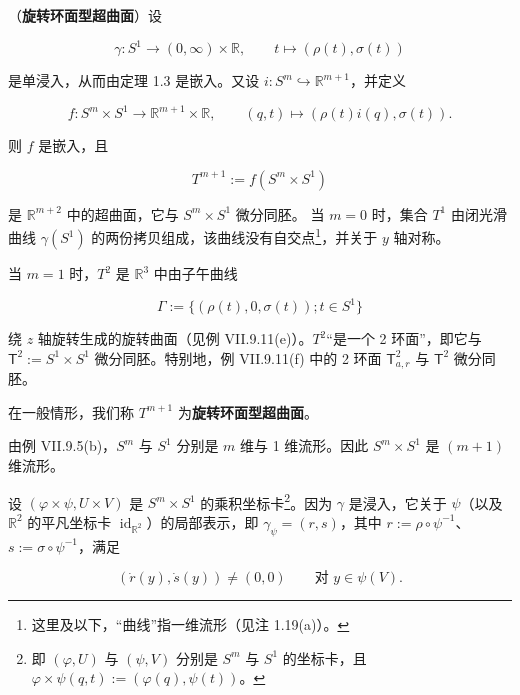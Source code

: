 \begin{example}
\begin{items}
\item[（b）]

（\textbf{旋转环面型超曲面}）设

\[
\gamma:S^1\to(0,\infty)\times\mathbb{R},\qquad t\mapsto(\rho(t),\sigma(t))
\]

是单浸入，从而由定理 1.3 是嵌入。又设 $ i:S^m\hookrightarrow\mathbb{R}^{m+1} $，并定义

\[
f:S^m\times S^1\to\mathbb{R}^{m+1}\times\mathbb{R},\qquad (q,t)\mapsto(\rho(t)i(q),\sigma(t)).
\]

则 $ f $ 是嵌入，且

\[
T^{m+1}:=f(S^m\times S^1)
\]

是 $ \mathbb{R}^{m+2} $ 中的超曲面，它与 $ S^m\times S^1 $ 微分同胚。
当 $ m=0 $ 时，集合 $ T^1 $ 由闭光滑曲线 $ \gamma(S^1) $ 的两份拷贝组成，该曲线没有自交点\footnote{这里及以下，“曲线”指一维流形（见注 1.19(a)）。}，并关于 $ y $ 轴对称。

\end{items}


当 $ m=1 $ 时，$ T^2 $ 是 $ \mathbb{R}^3 $ 中由子午曲线

\[
\Gamma:=\{(\rho(t),0,\sigma(t));t\in S^1\}
\]

绕 $ z $ 轴旋转生成的旋转曲面（见例 VII.9.11(e)）。$ T^2 $“是一个 2 环面”，即它与 $ \mathsf{T}^2:=S^1\times S^1 $ 微分同胚。特别地，例 VII.9.11(f) 中的 2 环面 $ \mathsf{T}^2_{a,r} $ 与 $ \mathsf{T}^2 $ 微分同胚。


在一般情形，我们称 $ T^{m+1} $ 为\textbf{旋转环面型超曲面}。

\proofhead
由例 VII.9.5(b)，$ S^m $ 与 $ S^1 $ 分别是 $ m $ 维与 1 维流形。因此 $ S^m\times S^1 $ 是 $ (m+1) $ 维流形。

设 $ (\varphi\times\psi,U\times V) $ 是 $ S^m\times S^1 $ 的乘积坐标卡\footnote{即 $ (\varphi,U) $ 与 $ (\psi,V) $ 分别是 $ S^m $ 与 $ S^1 $ 的坐标卡，且 $ \varphi\times\psi(q,t):=(\varphi(q),\psi(t)) $。}。因为 $ \gamma $ 是浸入，它关于 $ \psi $（以及 $ \mathbb{R}^2 $ 的平凡坐标卡 $ \operatorname{id}_{\mathbb{R}^2} $）的局部表示，即 $ \gamma_\psi=(r,s) $，其中 $ r:=\rho\circ\psi^{-1} $、$ s:=\sigma\circ\psi^{-1} $，满足

\begin{equation}
(\dot{r}(y),\dot{s}(y))\ne(0,0)\qquad \text{对 } y\in\psi(V).\tag{1.4}
\end{equation}


\end{example}
